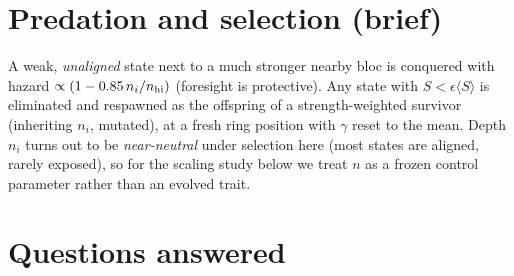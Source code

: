 \documentclass[11pt]{article}
\begin{document}
\section{Predation and selection (brief)}

A weak, \emph{unaligned} state next to a much stronger nearby bloc is conquered
with hazard $\propto(1-0.85\,n_i/n_{\rm hi})$ (foresight is protective). Any state
with $S<\epsilon\langle S\rangle$ is eliminated and respawned as the offspring of
a strength-weighted survivor (inheriting $n_i$, mutated), at a fresh ring
position with $\gamma$ reset to the mean. Depth $n_i$ turns out to be
\emph{near-neutral} under selection here (most states are aligned, rarely
exposed), so for the scaling study below we treat $n$ as a frozen control
parameter rather than an evolved trait.

\section{Questions answered}\label{sec:qa}
\end{document}
